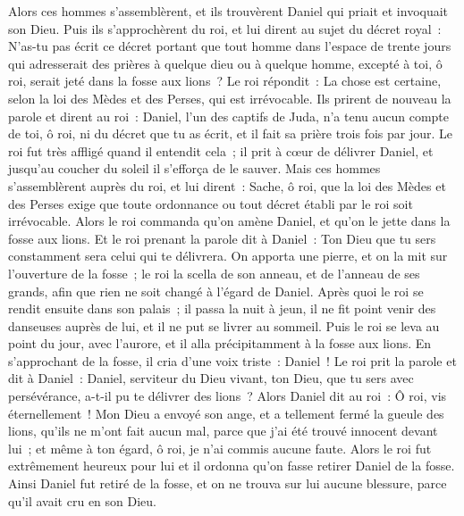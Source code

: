 \begin{multicols}{2}
Alors ces hommes s'assemblèrent, et ils trouvèrent Daniel qui priait et invoquait son Dieu.
Puis ils s'approchèrent du roi, et lui dirent au sujet du décret royal~: N'as-tu pas écrit ce décret portant que tout homme dans l'espace de trente jours qui adresserait des prières à quelque dieu ou à quelque homme, excepté à toi, ô roi, serait jeté dans la fosse aux lions~? Le roi répondit~: La chose est certaine, selon la loi des Mèdes et des Perses, qui est irrévocable.
Ils prirent de nouveau la parole et dirent au roi~: Daniel, l'un des captifs de Juda, n'a tenu aucun compte de toi, ô roi, ni du décret que tu as écrit, et il fait sa prière trois fois par jour.
Le roi fut très affligé quand il entendit cela~; il prit à cœur de délivrer Daniel, et jusqu'au coucher du soleil il s'efforça de le sauver.
Mais ces hommes s'assemblèrent auprès du roi, et lui dirent~: Sache, ô roi, que la loi des Mèdes et des Perses exige que toute ordonnance ou tout décret établi par le roi soit irrévocable.
Alors le roi commanda qu'on amène Daniel, et qu'on le jette dans la fosse aux lions. Et le roi prenant la parole dit à Daniel~: Ton Dieu que tu sers constamment sera celui qui te délivrera.
On apporta une pierre, et on la mit sur l'ouverture de la fosse~; le roi la scella de son anneau, et de l'anneau de ses grands, afin que rien ne soit changé à l'égard de Daniel.
Après quoi le roi se rendit ensuite dans son palais~; il passa la nuit à jeun, il ne fit point venir des danseuses auprès de lui, et il ne put se livrer au sommeil.
Puis le roi se leva au point du jour, avec l'aurore, et il alla précipitamment à la fosse aux lions.
En s'approchant de la fosse, il cria d'une voix triste~: Daniel~! Le roi prit la parole et dit à Daniel~: Daniel, serviteur du Dieu vivant, ton Dieu, que tu sers avec persévérance, a-t-il pu te délivrer des lions~?
Alors Daniel dit au roi~: Ô roi, vis éternellement~!
Mon Dieu a envoyé son ange, et a tellement fermé la gueule des lions, qu'ils ne m'ont fait aucun mal, parce que j'ai été trouvé innocent devant lui~; et même à ton égard, ô roi, je n'ai commis aucune faute. 
Alors le roi fut extrêmement heureux pour lui et il ordonna qu'on fasse retirer Daniel de la fosse. Ainsi Daniel fut retiré de la fosse, et on ne trouva sur lui aucune blessure, parce qu'il avait cru en son Dieu.

\end{multicols}
